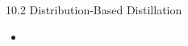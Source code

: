 \begin{frame}{10.2 Distribution-Based Distillation}
    \begin{itemize}
        \item
    \end{itemize}
\end{frame}
